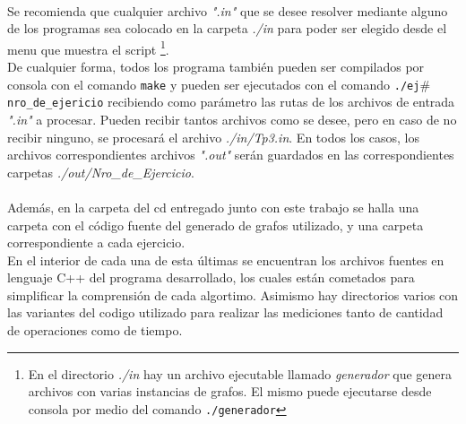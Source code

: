 \paragraph{}
Se recomienda que cualquier archivo \textit{".in"} que se desee resolver mediante alguno de los programas sea colocado en la carpeta \textit{./in} para poder ser elegido desde el menu que muestra el script \footnote{En el directorio \textit{./in} hay un archivo ejecutable llamado \textit{generador} que genera archivos con varias instancias de grafos. El mismo puede ejecutarse desde consola por medio del comando \texttt{./generador}}. \\
De cualquier forma, todos los programa también pueden ser compilados por consola con el comando \texttt{make} y pueden ser ejecutados con el comando \texttt{./ej$\#$nro\_de\_ejericio} recibiendo como parámetro las rutas de los archivos de entrada \textit{".in"} a procesar. Pueden recibir tantos archivos como se desee, pero en caso de no recibir ninguno, se procesará el archivo \textit{./in/Tp3.in}. En todos los casos, los archivos correspondientes archivos \textit{".out"} serán guardados en las correspondientes carpetas \textit{./out/Nro\_de\_Ejercicio}.

\paragraph{}
Además, en la carpeta del cd entregado junto con este trabajo se halla una carpeta con el código fuente del generado de grafos utilizado, y una carpeta correspondiente a cada ejercicio. \\
En el interior de cada una de esta últimas se encuentran los archivos fuentes en lenguaje C++ del programa desarrollado, los cuales están cometados para simplificar la comprensión de cada algortimo. Asimismo hay directorios varios con las variantes del codigo utilizado para realizar las mediciones tanto de cantidad de operaciones como de tiempo.
